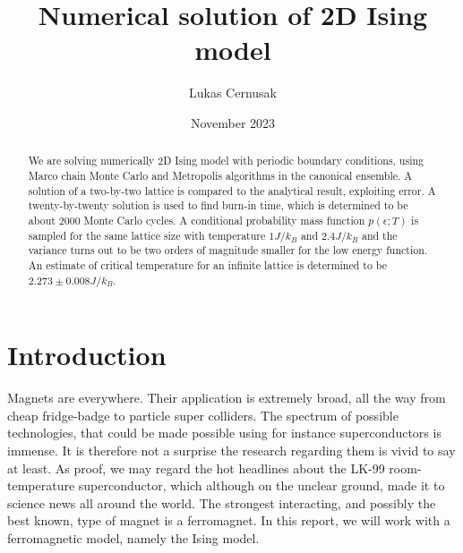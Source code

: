 \documentclass[english,notitlepage,reprint,nofootinbib]{revtex4-1}  %
\begin{document}
\title{Numerical solution of 2D Ising model}  %
\author{Lukas Cernusak} %
\date{November 2023}                             %
\noaffiliation                            %


\begin{abstract}

We are solving numerically 2D Ising model with periodic boundary conditions, using Marco chain Monte Carlo and Metropolis algorithms in the canonical ensemble. A solution of a two-by-two lattice is compared to the analytical result, exploiting error. A twenty-by-twenty solution is used to find burn-in time, which is determined to be about $2000$ Monte Carlo cycles. A conditional probability mass function $p(\epsilon; T)$ is sampled for the same lattice size with temperature $1J/k_B$ and $2.4J/k_B$ and the variance turns out to be two orders of magnitude smaller for the low energy function. An estimate of critical temperature for an infinite lattice is determined to be $2.273 \pm 0.008 J/k_B$.

\end{abstract}



\maketitle







\section{Introduction}
%
Magnets are everywhere. Their application is extremely broad, all the way from cheap fridge-badge to particle super colliders. The spectrum of possible technologies, that could be made possible using for instance superconductors is immense. It is therefore not a surprise the research regarding them is vivid to say at least. As proof, we may regard the hot headlines about the LK-99 room-temperature superconductor, which although on the unclear ground, made it to science news all around the world. The strongest interacting, and possibly the best known, type of magnet is a ferromagnet. In this report, we will work with a ferromagnetic model, namely the Ising model.
\end{document}
